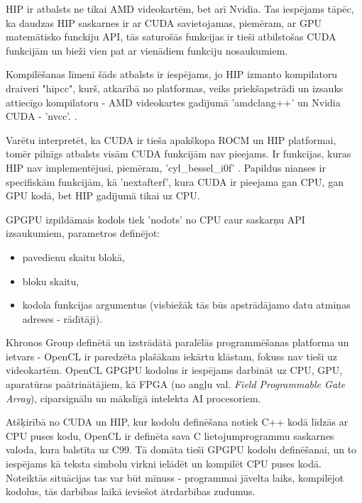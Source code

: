 HIP ir atbalsts ne tikai AMD videokartēm, bet arī Nvidia. Tas iespējams tāpēc,
ka  daudzas HIP saskarnes ir ar CUDA savietojamas, piemēram, ar GPU matemātisko
funckiju API, tās saturošās funkcijas ir tieši atbilstošas CUDA funkcijām un
bieži vien pat ar vienādiem funkciju nosaukumiem.
\cite{HIP_math_API,CUDA_math_API}

Kompilēšanas līmenī šāds atbalsts ir iespējams, jo HIP izmanto kompilatoru
draiveri "hipcc", kurš, atkarībā no platformas, veiks priekšapstrādi un izsauks
attiecīgo kompilatoru - AMD videokartes gadījumā 'amdclang++' un Nvidia CUDA -
'nvcc'. \cite{HIP_compilers}.

Varētu interpretēt, ka CUDA ir tieša apakškopa ROCM un HIP platformai, tomēr pilnīgs atbalsts
visām CUDA funkcijām nav pieejams. Ir funkcijas, kuras HIP nav implementējusi, piemēram,
'cyl\_bessel\_i0f' \cite{HIP_math_API}. Papildus nianses ir specifiskām funkcijām, kā 'nextafterf', kura CUDA
ir pieejama gan CPU, gan GPU kodā, bet HIP gadījumā tikai uz CPU. \cite{HIP_math_API}

GPGPU izpildāmais kodols tiek 'nodots' no CPU caur saskarņu API izsaukumiem,
parametros definējot:
\begin{itemize}
    \item pavedienu skaitu blokā,
    \item bloku skaitu,
    \item kodola funkcijas argumentus (visbiežāk tās būs apstrādājamo datu
        atmiņas adreses - rādītāji). \cite{GPGPU_gramata}
\end{itemize}


Khronos Group definētā un izstrādātā paralēlās programmēšanas platforma un
ietvars - OpenCL ir paredzēta plašākam iekārtu klāstam, fokuss nav tieši uz
videokartēm. OpenCL GPGPU kodolus ir iespējams darbināt uz CPU, GPU,
aparatūras paātrinātājiem, kā FPGA (no angļu val. \textit{Field Programmable Gate
Array}), ciparsignālu un mākslīgā intelekta AI procesoriem. \cite{opencl-spec}

Atšķirībā no CUDA un HIP, kur kodolu definēšana notiek C++ kodā līdzās ar CPU
puses kodu, OpenCL ir definēta sava C lietojumprogrammu saskarnes valoda, kura
balstīta uz C99.\cite{opencl_c_lang_spec} Tā domāta tieši GPGPU kodolu
definēšanai, un to iespējams kā teksta simbolu virkni ielādēt un kompilēt CPU
puses kodā. Noteiktās situācijas tas var būt mīnuss - programmai jāvelta laiks,
kompilējot kodolus, tās darbības laikā ieviešot ātrdarbības zudumus.

